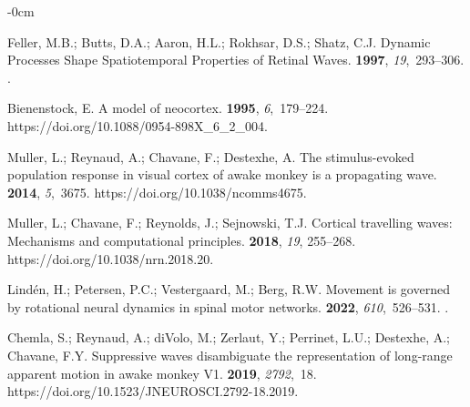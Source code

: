 \documentclass[brainsci, %
               review,accept,pdftex,moreauthors
               ]{Definitions/mdpi}
\begin{document}
\begin{adjustwidth}{-\extralength}{0cm}
\begin{thebibliography}{999}
Feller, M.B.; Butts, D.A.; Aaron, H.L.; Rokhsar, D.S.; Shatz, C.J.
\newblock Dynamic {Processes} {Shape} {Spatiotemporal} {Properties} of
  {Retinal} {Waves}.
 {\bf 1997}, {\em 19},~293--306.
.

Bienenstock, E.
\newblock A model of neocortex.
 {\bf 1995}, {\em
  6},~179--224.
  {{https://doi.org/10.1088/0954-898X\_6\_2\_004}}.

Muller, L.; Reynaud, A.; Chavane, F.; Destexhe, A.
\newblock The stimulus-evoked population response in visual cortex of awake
  monkey is a propagating wave.
 {\bf 2014}, {\em 5},~3675.
  {{https://doi.org/10.1038/ncomms4675}}.

Muller, L.; Chavane, F.; Reynolds, J.; Sejnowski, T.J.
\newblock Cortical travelling waves: {Mechanisms} and computational principles.
 {\bf 2018}, \emph{19}, 255--268.
  {{https://doi.org/10.1038/nrn.2018.20}}.

Lindén, H.; Petersen, P.C.; Vestergaard, M.; Berg, R.W.
\newblock Movement is governed by rotational neural dynamics in spinal motor
  networks.
 {\bf 2022}, {\em 610},~526--531.
.

Chemla, S.; Reynaud, A.; diVolo, M.; Zerlaut, Y.; Perrinet, L.U.; Destexhe, A.;
  Chavane, F.Y.
\newblock Suppressive waves disambiguate the representation of long-range
  apparent motion in awake monkey {V1}.
 {\bf 2019}, {\em 2792},~18.
  {{https://doi.org/10.1523/JNEUROSCI.2792-18.2019}}.


\end{thebibliography}
\end{adjustwidth}
\end{document}
